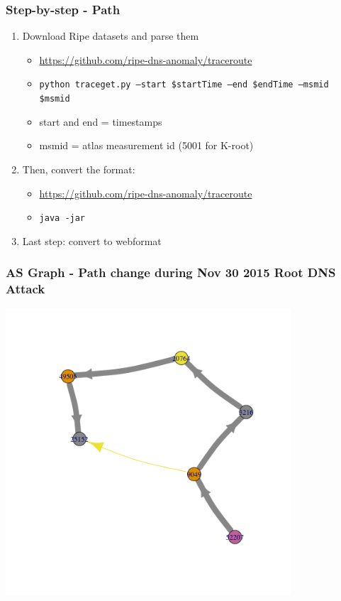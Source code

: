 \documentclass[serif]{beamer}
\begin{document}
\begin{frame}[fragile]
	\frametitle{Step-by-step - Path}
	
\begin{enumerate}
 \item Download Ripe datasets and parse them
 \begin{itemize}
  \item \url{https://github.com/ripe-dns-anomaly/traceroute }
  \item \texttt{python traceget.py --start \$startTime --end \$endTime --msmid \$msmid}
  \item start and end = timestamps
  \item msmid = atlas measurement id (5001 for K-root)
 \end{itemize}

 \item Then, convert the format:
 \begin{itemize}
  \item \url{https://github.com/ripe-dns-anomaly/traceroute}
  \item \texttt{java -jar}
 \end{itemize}

 \item Last step: convert to webformat
\end{enumerate}

\end{frame}

\begin{frame}[fragile]
	\frametitle{AS Graph - Path change during Nov 30 2015 Root DNS Attack}
	\includegraphics[width=0.8\textwidth]{fig/10274.png}
\end{frame}
\end{document}
